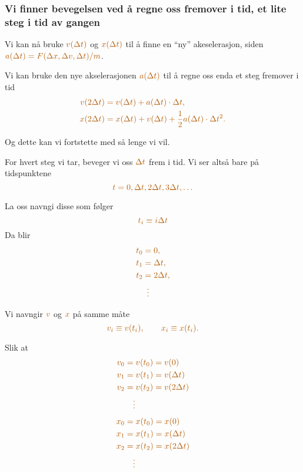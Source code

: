 \documentclass[english, 12pt]{beamer}
\newcommand{\alrt}{\color{AlertColor}}
\begin{document}
\begin{frame}[fragile]
\frametitle{Vi finner bevegelsen ved å regne oss fremover i tid, et lite steg i tid av gangen}

Vi kan nå bruke $\alrt v(\Delta t)$ og $\alrt x(\Delta t)$ til å finne en ``ny'' akeselerasjon, siden $\alrt a(\Delta t) = F(\Delta x, \Delta v, \Delta t)/m$. 

 {
Vi kan bruke den nye akselerasjonen $\alrt a(\Delta t)$ til å regne oss enda et steg fremover i tid
\begin{align*}
\alrt v(2\Delta t) &\alrt= v(\Delta t) + a(\Delta t) \cdot \Delta t, \\
\alrt x(2\Delta t) &\alrt= x(\Delta t) + v(\Delta t)  + \frac{1}{2}a(\Delta t) \cdot \Delta t^2.
\end{align*}
}

 {
Og dette kan vi fortstette med så lenge vi vil.
}
\end{frame}

\begin{frame}[fragile]
For hvert steg vi tar, beveger vi oss $\alrt \Delta t$ frem i tid. Vi ser altså bare på tidspunktene
$$\alrt t = 0, \Delta t, 2\Delta t, 3\Delta t, \ldots$$

 {	
La oss navngi disse som følger
$$\alrt t_i \equiv i\Delta t$$
Da blir
\begin{align*}
\alrt t_0 &\alrt= 0, \\
\alrt t_1 &\alrt= \Delta t, \\
\alrt t_2 &\alrt= 2\Delta t, \\
& \, \ \alrt \vdots
\end{align*}
}
\end{frame}

\begin{frame}
Vi navngir $\alrt v$ og $\alrt x$ på samme måte
$$\alrt v_i \equiv v(t_i), \qquad \alrt x_i \equiv x(t_i).$$

 {	
Slik at
\begin{align*}
\alrt v_0 &\alrt= v(t_0) = v(0) \\
\alrt v_1 &\alrt= v(t_1) = v(\Delta t) \\
\alrt v_2 &\alrt= v(t_2) = v(2\Delta t) \\
&\alrt\quad\vdots
\end{align*}
\begin{align*}
\alrt x_0 &\alrt= x(t_0) = x(0) \\
\alrt x_1 &\alrt= x(t_1) = x(\Delta t) \\
\alrt x_2 &\alrt= x(t_2) = x(2\Delta t) \\
&\alrt\quad\vdots
\end{align*}
}
\end{frame}
\end{document}
